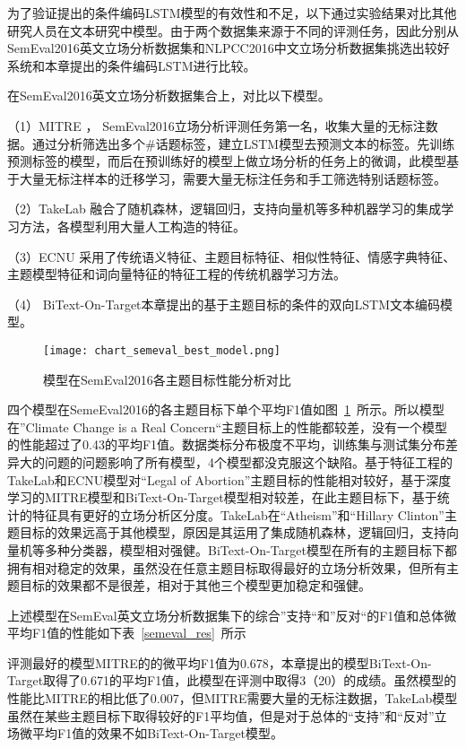 为了验证提出的条件编码LSTM模型的有效性和不足，以下通过实验结果对比其他研究人员在文本研究中模型。由于两个数据集来源于不同的评测任务，因此分别从SemEval2016英文立场分析数据集和NLPCC2016中文立场分析数据集挑选出较好系统和本章提出的条件编码LSTM进行比较。

在SemEval2016英文立场分析数据集合上，对比以下模型。

（1）MITRE ， SemEval2016立场分析评测任务第一名，收集大量的无标注数据。通过分析筛选出多个\#话题标签，建立LSTM模型去预测文本的标签。先训练预测标签的模型，而后在预训练好的模型上做立场分析的任务上的微调，此模型基于大量无标注样本的迁移学习，需要大量无标注任务和手工筛选特别话题标签。

（2）TakeLab  融合了随机森林，逻辑回归，支持向量机等多种机器学习的集成学习方法，各模型利用大量人工构造的特征。

（3）ECNU 采用了传统语义特征、主题目标特征、相似性特征、情感字典特征、主题模型特征和词向量特征的特征工程的传统机器学习方法。

（4） BiText-On-Target本章提出的基于主题目标的条件的双向LSTM文本编码模型。

\begin{figure}[htbp]
	\centering
	\texttt{[image: chart\_semeval\_best\_model.png]}
	\caption[rnn_vanish]{模型在SemEval2016各主题目标性能分析对比}
	\label{chart_semeval_best_model}
\end{figure}
四个模型在SemeEval2016的各主题目标下单个平均F1值如图~\ref{chart_semeval_best_model}~所示。所以模型在”Climate Change is a Real Concern“主题目标上的性能都较差，没有一个模型的性能超过了0.43的平均F1值。数据类标分布极度不平均，训练集与测试集分布差异大的问题的问题影响了所有模型，4个模型都没克服这个缺陷。基于特征工程的TakeLab和ECNU模型对“Legal of Abortion”主题目标的性能相对较好，基于深度学习的MITRE模型和BiText-On-Target模型相对较差，在此主题目标下，基于统计的特征具有更好的立场分析区分度。TakeLab在“Atheism”和“Hillary Clinton”主题目标的效果远高于其他模型，原因是其运用了集成随机森林，逻辑回归，支持向量机等多种分类器，模型相对强健。BiText-On-Target模型在所有的主题目标下都拥有相对稳定的效果，虽然没在任意主题目标取得最好的立场分析效果，但所有主题目标的效果都不是很差，相对于其他三个模型更加稳定和强健。

上述模型在SemEval英文立场分析数据集下的综合”支持“和”反对“的F1值和总体微平均F1值的性能如下表~\ref{semeval_res}~所示

评测最好的模型MITRE的的微平均F1值为0.678，本章提出的模型BiText-On-Target取得了0.671的平均F1值，此模型在评测中取得3（20）的成绩。虽然模型的性能比MITRE的相比低了0.007，但MITRE需要大量的无标注数据，TakeLab模型虽然在某些主题目标下取得较好的F1平均值，但是对于总体的“支持”和“反对”立场微平均F1值的效果不如BiText-On-Target模型。

